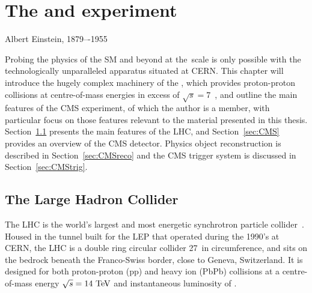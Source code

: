 
\chapter{The \LHC and \CMS experiment}
\label{chap:detector}

{Albert Einstein, 1879–-1955}

Probing the physics of the \ac{SM} and beyond at the~\TeV scale is only possible with the technologically unparalleled apparatus situated at \ac{CERN}.
This chapter will introduce the hugely complex machinery of the \LHC, 
which provides proton-proton collisions at centre-of-mass energies in excess of $\sqrt{s}=7$~\TeV, 
and outline the main features of the \ac{CMS} experiment, of which the author is a member, 
with particular focus on those features relevant to the material presented in this thesis.
%
Section~\ref{sec:LHC} presents the main features of the \ac{LHC}, and Section~\ref{sec:CMS} provides an overview of the \ac{CMS} detector. Physics object reconstruction is described in Section~\ref{sec:CMSreco} and the \ac{CMS} trigger system is discussed in Section~\ref{sec:CMStrig}. 

%                                                                  

\section{The Large Hadron Collider}
\label{sec:LHC}
The \ac{LHC} is the world's largest and most energetic synchrotron particle collider~\cite{bib:LHC}. 
Housed in the tunnel built for the \ac{LEP} that operated during the 1990's at \ac{CERN}, 
the \ac{LHC} is a double ring circular collider 27~\km in circumference, 
and sits on the bedrock beneath the Franco-Swiss border, close to Geneva, Switzerland. 
It is designed for both proton-proton (pp) and heavy ion (PbPb) collisions at a centre-of-mass energy $\sqrt{s} = 14~\mathrm{TeV}$ and instantaneous luminosity of \designLumi.


